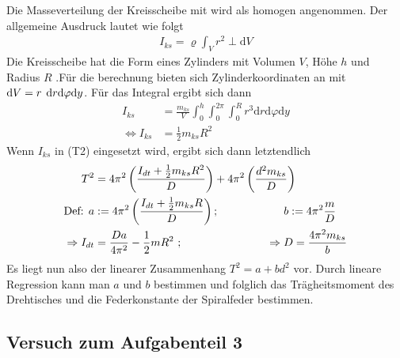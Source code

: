 \documentclass[11pt,a4paper]{article}
\begin{document}
Die Masseverteilung der Kreisscheibe mit wird als homogen angenommen. Der allgemeine Ausdruck lautet wie folgt
\begin{align}
	I_{ks} = \varrho\int_{V}^{}r^2\perp\mathrm{d}V
\end{align}
Die Kreisscheibe hat die Form eines Zylinders mit Volumen $V $, Höhe $h$ und Radius $R$ .Für die berechnung bieten sich Zylinderkoordinaten an mit $\mathrm{d}V=r\hspace{0.15cm}\mathrm{d}r\mathrm{d}\varphi\mathrm{d}y$.
Für das Integral ergibt sich dann
\begin{align}
	I_{ks} &= \frac{m_{ks}}{V} \int_{0}^{h}\int_{0}^{2\pi}\int_{0}^{R} r^3 \mathrm{d}r\mathrm{d}\varphi\mathrm{d}y \\
	\Leftrightarrow I_{ks} &= \frac{1}{2} m_{ks}R^2
\end{align}
Wenn $I_{ks}$ in (T2) eingesetzt wird, ergibt sich dann letztendlich
\begin{align}
	T^2 &= 4 \pi^2 \left(\frac{I_{dt}+ \frac{1}{2} m_{ks}R^2}{D}\right) +4\pi^2 \left(\frac{d^2m_{ks}}{D}\right)\\
	\text{Def: } a&:= 4\pi^2\left(\frac{I_{dt}+\frac{1}{2}m_{ks}R}{D}\right) \text{;  } \hspace{2cm}b:= 4\pi^2\frac{m}{D}\\
	\Rightarrow I_{dt} &= \frac{Da}{4\pi^2}-\frac{1}{2}mR^2\text{ ; }\hspace{2.6cm}\Rightarrow D = \frac{4\pi^2 m_{ks}}{b}
\end{align}
Es liegt nun also der linearer Zusammenhang $T^2=a+bd^2$ vor. Durch lineare Regression kann man $a$ und $b$ bestimmen und folglich das Trägheitsmoment des Drehtisches und die Federkonstante der Spiralfeder bestimmen.





\subsection{Versuch zum Aufgabenteil 3}
\end{document}

